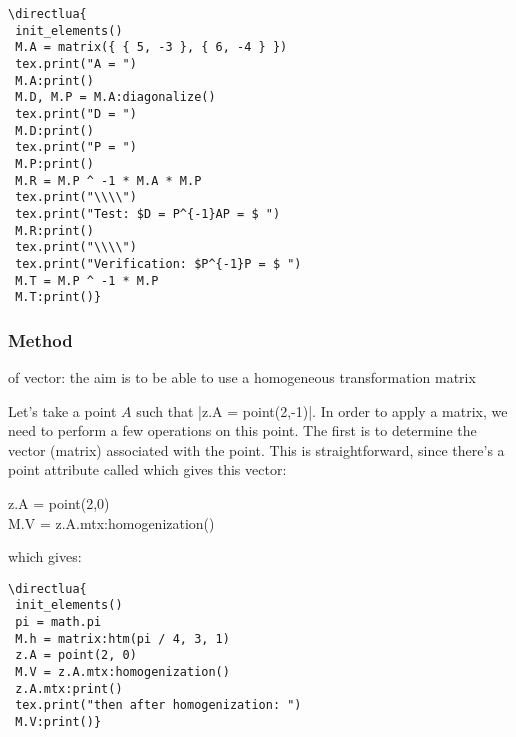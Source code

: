 \begin{minipage}{.5\textwidth}
\begin{verbatim}
\directlua{
 init_elements()
 M.A = matrix({ { 5, -3 }, { 6, -4 } })
 tex.print("A = ")
 M.A:print()
 M.D, M.P = M.A:diagonalize()
 tex.print("D = ")
 M.D:print()
 tex.print("P = ")
 M.P:print()
 M.R = M.P ^ -1 * M.A * M.P
 tex.print("\\\\")
 tex.print("Test: $D = P^{-1}AP = $ ")
 M.R:print()
 tex.print("\\\\")
 tex.print("Verification: $P^{-1}P = $ ")
 M.T = M.P ^ -1 * M.P
 M.T:print()}
\end{verbatim}
\end{minipage}
\begin{minipage}{.5\textwidth}
\end{minipage}

\subsubsection{Method }
\label{ssub:method_homogenization}

 of vector: the aim is to be able to use a homogeneous transformation matrix

Let's take a point $A$ such that |z.A = point(2,-1)|. In order to apply a   matrix, we need to perform a few operations on this point. The first is to determine the vector (matrix) associated with the point. This is straightforward, since there's a point attribute called  which gives this vector:

\begin{mybox}
z.A = point(2,0)\\
M.V = z.A.mtx:homogenization()
\end{mybox}
which gives:

\begin{minipage}{.5\textwidth}
\begin{verbatim}
\directlua{
 init_elements()
 pi = math.pi
 M.h = matrix:htm(pi / 4, 3, 1)
 z.A = point(2, 0)
 M.V = z.A.mtx:homogenization()
 z.A.mtx:print()
 tex.print("then after homogenization: ")
 M.V:print()}
\end{verbatim}
\end{minipage}
\begin{minipage}{.5\textwidth}
\end{minipage}

